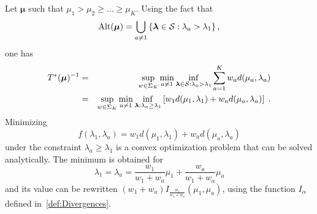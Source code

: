 \documentclass{colt2016} %
\begin{document}
Let $\bm \mu$ such that $\mu_1>\mu_2 \geq \dots \geq \mu_K$.  Using the fact that 
\[\mathrm{Alt}(\bm\mu)=\bigcup_{a \neq 1} \left\{\bm \lambda \in \mathcal{S} : \lambda_a > \lambda_{1}\right\},\]
one has 
\begin{eqnarray*}
T^*(\bm\mu)^{-1} & = & \sup_{w \in \Sigma_K} \min_{a \neq 1} \inf_{\bm \lambda \in \mathcal{S} : \lambda_a > \lambda_{1}} \sum_{a=1}^K w_a d(\mu_a,\lambda_a) \\
& = &  \sup_{w \in \Sigma_K} \min_{a \neq 1} \inf_{\bm \lambda  : \lambda_a \geq \lambda_{1}} \left[w_1d(\mu_{1},\lambda_{1})+w_a d(\mu_a,\lambda_a)\right]\;.
\end{eqnarray*}
Minimizing
\[f(\lambda_{1},\lambda_a) = w_1d(\mu_{1},\lambda_{1})+w_a d(\mu_a,\lambda_a)\]
under the constraint $\lambda_a \geq \lambda_{1}$ is a convex optimization problem that can be solved analytically. The minimum is obtained for 
\[\lambda_{1} = \lambda_a = \frac{w_1}{w_1+w_a}\mu_{1} + \frac{w_a}{w_1+w_a}\mu_{a}\]
and its value can be rewritten $(w_1 + w_a) I_{\frac{w_1}{w_1 + w_a}}(\mu_{1},\mu_a)$, using the function $I_\alpha$ defined in~\eqref{def:Divergences}.
 
\end{document}
